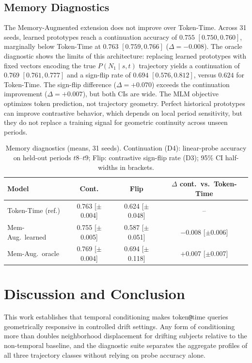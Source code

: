 \documentclass[runningheads]{llncs}
\begin{document}
\subsection{Memory Diagnostics}
The Memory-Augmented extension does not improve over Token-Time. Across 31
seeds, learned prototypes reach a continuation
accuracy of \(0.755\) \([0.750, 0.760]\), marginally below Token-Time at
\(0.763\) \([0.759, 0.766]\) (\(\Delta=-0.008\)). The oracle diagnostic
shows the limits of this architecture: replacing learned prototypes with fixed
vectors encoding the true \(P(N_1 \mid s, t)\) trajectory yields a
continuation of \(0.769\) \([0.761, 0.777]\) and a sign-flip rate of \(0.694\)
\([0.576, 0.812]\), versus \(0.624\) for Token-Time. The sign-flip difference
(\(\Delta=+0.070\)) exceeds the continuation improvement
(\(\Delta=+0.007\)), but both CIs are wide. The MLM objective optimizes token
prediction, not trajectory geometry. Perfect historical prototypes can improve
contrastive behavior, which depends on local period sensitivity, but they do not
replace a training signal for geometric continuity across unseen periods.

\begin{table}[t]
\caption{Memory diagnostics (means, 31 seeds). Continuation (D4): linear-probe
accuracy on held-out periods \(t8\)--\(t9\); Flip: contrastive sign-flip rate
(D3); 95\% CI half-widths in brackets.}
\label{tab:memory-diagnostics}
\centering
\scriptsize
\renewcommand{\arraystretch}{0.88}
\setlength{\tabcolsep}{4pt}
\begin{tabular}{lccc}
\toprule
\textbf{Model} & \textbf{Cont.} & \textbf{Flip} & \textbf{$\Delta$ cont.\ vs.\ Token-Time} \\
\midrule
Token-Time (ref.)  & 0.763 [$\pm$0.004] & 0.624 [$\pm$0.048] & -- \\
Mem-Aug.\ learned  & 0.755 [$\pm$0.005] & 0.587 [$\pm$0.051] & $-$0.008 [$\pm$0.006] \\
Mem-Aug.\ oracle   & 0.769 [$\pm$0.004] & 0.694 [$\pm$0.118] & $+$0.007 [$\pm$0.007] \\
\bottomrule
\end{tabular}
\end{table}

\section{Discussion and Conclusion}
This work establishes that temporal conditioning makes token\texttt{@}time
queries geometrically responsive in controlled drift settings. Any form of conditioning more than doubles
neighborhood displacement for drifting subjects relative to the non-temporal
baseline, and the diagnostic suite separates the aggregate profiles of all three trajectory classes
without relying on probe accuracy alone.
\end{document}

